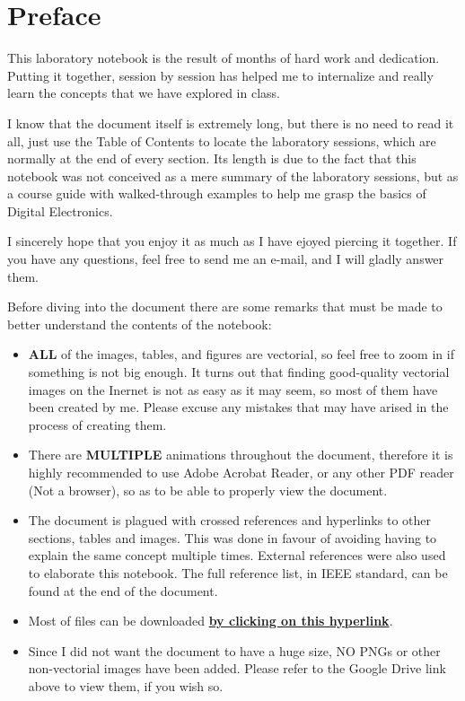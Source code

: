 \section*{Preface}
\thispagestyle{empty}

This laboratory notebook is the result of months of hard work and dedication. Putting it together, session by session has helped me to internalize and really learn the concepts that we have explored in class.\medskip

I know that the document itself is extremely long, but there is no need to read it all, just use the Table of Contents to locate the laboratory sessions, which are normally at the end of every section. Its length is due to the fact that this notebook was not conceived as a mere summary of the laboratory sessions, but as a course guide with walked-through examples to help me grasp the basics of Digital Electronics.\medskip

I sincerely hope that you enjoy it as much as I have ejoyed piercing it together. If you have any questions, feel free to send me an e-mail, and I will gladly answer them.\medskip

Before diving into the document there are some remarks that must be made to better understand the contents of the notebook:


\begin{itemize}
    \item \textbf{ALL} of the images, tables, and figures are vectorial, so feel free to zoom in if something is not big enough. It turns out that finding good-quality vectorial images on the Inernet is not as easy as it may seem, so most of them have been created by me. Please excuse any mistakes that may have arised in the process of creating them. 
    
    \item There are \textbf{MULTIPLE} animations throughout the document, therefore it is highly recommended to use Adobe Acrobat Reader, or any other PDF reader (Not a browser), so as to be able to properly view the document.
    
    \item The document is plagued with crossed references and hyperlinks to other sections, tables and images. This was done in favour of avoiding having to explain the same concept multiple times. External references were also used to elaborate this notebook. The full reference list, in IEEE standard, can be found at the end of the document.
    
    \item Most of files can be downloaded \textbf{\href{https://drive.google.com/drive/folders/1nyozHdgMbIUZzLSXmLZj1Xq8IMVYWvJI?usp=sharing}{by clicking on this hyperlink}}.
    
    \item Since I did not want the document to have a huge size, NO PNGs or other non-vectorial images have been added. Please refer to the Google Drive link above to view them, if you wish so.
    
\end{itemize}\medskip

